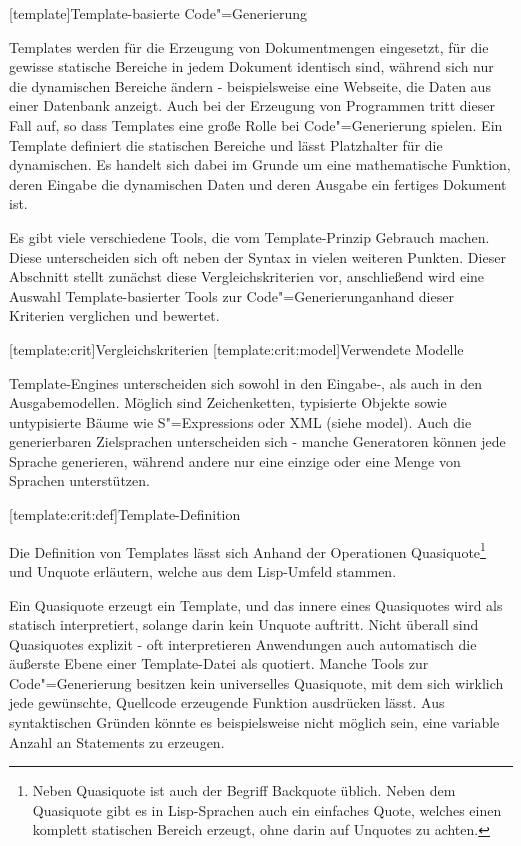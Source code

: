 \documentclass[11pt, a4paper, bibgerm]{book}
\newcommand\lchapter{}
\newcommand\lsection{}
\newcommand\lsubsection{}
\newcommand\cref{}
\newcommand{\seec}[1]{(siehe \cref{#1})}
\newcommand{\sexps}{S"=Expressions}
\newcommand{\cgen}{Code"=Generierung}
\begin{document}
\lchapter[template]{Template-basierte \cgen{}}

Templates werden für die Erzeugung von Dokumentmengen eingesetzt, für
die gewisse statische Bereiche in jedem Dokument identisch sind, während
sich nur die dynamischen Bereiche ändern - beispielsweise eine Webseite,
die Daten aus einer Datenbank anzeigt. Auch bei der Erzeugung von
Programmen tritt dieser Fall auf, so dass Templates eine große Rolle bei
\cgen{} spielen. Ein Template definiert die
statischen Bereiche und lässt Platzhalter für die dynamischen. Es
handelt sich dabei im Grunde um eine mathematische Funktion, deren
Eingabe die dynamischen Daten und deren Ausgabe ein fertiges Dokument
ist.

Es gibt viele verschiedene Tools, die vom Template-Prinzip Gebrauch
machen. Diese unterscheiden sich oft neben der Syntax in vielen weiteren
Punkten. Dieser Abschnitt stellt zunächst diese Vergleichskriterien vor,
anschließend wird eine Auswahl Template-basierter Tools zur \cgen anhand
dieser Kriterien verglichen und bewertet.

\lsection[template:crit]{Vergleichskriterien}
\lsubsection[template:crit:model]{Verwendete Modelle}

Template-Engines unterscheiden sich sowohl in den Eingabe-, als auch in
den Ausgabemodellen. Möglich sind Zeichenketten, typisierte Objekte
sowie untypisierte Bäume wie \sexps{} oder XML \seec{model}. Auch
die generierbaren Zielsprachen unterscheiden sich - manche Generatoren
können jede Sprache generieren, während andere nur eine einzige oder
eine Menge von Sprachen unterstützen.

\lsubsection[template:crit:def]{Template-Definition}

Die Definition von Templates lässt sich Anhand der Operationen
Quasiquote\footnote{Neben Quasiquote ist auch der Begriff Backquote
  üblich. Neben dem Quasiquote gibt es in Lisp-Sprachen auch ein
  einfaches Quote, welches einen komplett statischen Bereich erzeugt,
  ohne darin auf Unquotes zu achten.} und Unquote erläutern, welche aus
dem Lisp-Umfeld stammen.

Ein Quasiquote erzeugt ein Template, und das innere eines Quasiquotes
wird als statisch interpretiert, solange darin kein Unquote
auftritt. Nicht überall sind Quasiquotes explizit - oft interpretieren
Anwendungen auch automatisch die äußerste Ebene einer Template-Datei als
quotiert. Manche Tools zur \cgen{} besitzen kein universelles
Quasiquote, mit dem sich wirklich jede gewünschte, Quellcode erzeugende
Funktion ausdrücken lässt. Aus syntaktischen Gründen könnte es
beispielsweise nicht möglich sein, eine variable Anzahl an Statements zu
erzeugen.
\end{document}

